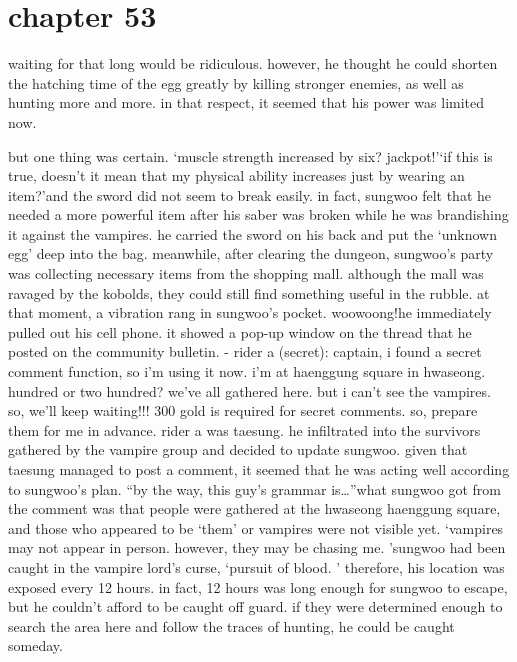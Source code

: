 \section{chapter 53}

                            waiting for that long would be ridiculous.
 however, he thought he could shorten the hatching time of the egg greatly by killing stronger enemies, as well as hunting more and more.
 in that respect, it seemed that his power was limited now.





but one thing was certain.
‘muscle strength increased by six? jackpot!’‘if this is true, doesn’t it mean that my physical ability increases just by wearing an item?’and the sword did not seem to break easily.
 in fact, sungwoo felt that he needed a more powerful item after his saber was broken while he was brandishing it against the vampires.
he carried the sword on his back and put the ‘unknown egg’ deep into the bag.
meanwhile, after clearing the dungeon, sungwoo’s party was collecting necessary items from the shopping mall.
 although the mall was ravaged by the kobolds, they could still find something useful in the rubble.
at that moment, a vibration rang in sungwoo’s pocket.
woowoong!he immediately pulled out his cell phone.
 it showed a pop-up window on the thread that he posted on the community bulletin.
- rider a (secret): captain, i found a secret comment function, so i’m using it now.
i’m at haenggung square in hwaseong.
 hundred or two hundred? we’ve all gathered here.
 but i can’t see the vampires.
 so, we’ll keep waiting!!! 300 gold is required for secret comments.
 so, prepare them for me in advance.
rider a was taesung.
 he infiltrated into the survivors gathered by the vampire group and decided to update sungwoo.
 given that taesung managed to post a comment, it seemed that he was acting well according to sungwoo’s plan.
“by the way, this guy’s grammar is…”what sungwoo got from the comment was that people were gathered at the hwaseong haenggung square, and those who appeared to be ‘them’ or vampires were not visible yet.
 ‘vampires may not appear in person.
 however, they may be chasing me.
’sungwoo had been caught in the vampire lord’s curse, ‘pursuit of blood.
’ therefore, his location was exposed every 12 hours.
 in fact, 12 hours was long enough for sungwoo to escape, but he couldn’t afford to be caught off guard.
 if they were determined enough to search the area here and follow the traces of hunting, he could be caught someday.

